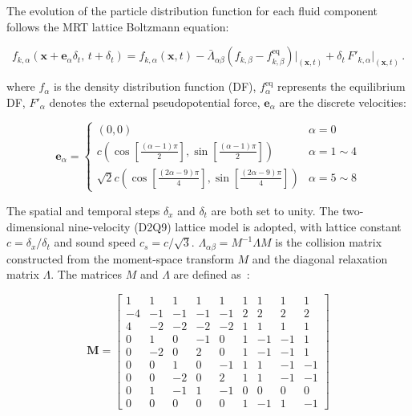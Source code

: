 \documentclass[draft,wrr]{agutexSI2019}
\begin{document}
\begin{article}
The evolution of the particle distribution function for each fluid component
follows the MRT lattice Boltzmann equation:
\begin{linenomath*}
\begin{equation}
\label{eq:mrt-evolution}
f_{k,\alpha}(\mathbf{x}+\mathbf{e}_{\alpha}\delta_t,\, t+\delta_t)
=
f_{k,\alpha}(\mathbf{x},t)
-
\bar{\Lambda}_{\alpha\beta}
\left(
f_{k,\beta}-f_{k,\beta}^{\mathrm{eq}}
\right)\big|_{(\mathbf{x},t)}
+
\delta_t\, F'_{k,\alpha}\big|_{(\mathbf{x},t)} \, .
\end{equation}
\end{linenomath*}
where $f_{\alpha}$ is the density distribution function (DF),
$f_{\alpha}^{\mathrm{eq}}$ represents the equilibrium DF,
$F'_{\alpha}$ denotes the external pseudopotential force,
$\mathbf{e}_{\alpha}$ are the discrete velocities:

\begin{linenomath*}
\begin{equation}
\label{eq:discrete-velocities}
\mathbf{e}_{\alpha} = \begin{cases}
(0,0) & \alpha=0 \\[1.5ex] %
c\left(\cos \left[\frac{(\alpha-1) \pi}{2}\right], \sin \left[\frac{(\alpha-1) \pi}{2}\right]\right) & \alpha=1 \sim 4 \\[1.5ex]
\sqrt{2} c\left(\cos \left[\frac{(2 \alpha-9) \pi}{4}\right], \sin \left[\frac{(2 \alpha-9) \pi}{4}\right]\right) & \alpha=5 \sim 8
\end{cases}
\end{equation}
\end{linenomath*}
The spatial and temporal steps $\delta_x$ and $\delta_t$
are both set to unity. The two-dimensional nine-velocity (D2Q9) lattice model
is adopted, with lattice constant $c = \delta_x/\delta_t$ and sound speed
$c_s = c/\sqrt{3}$.
$\Lambda_{\alpha\beta} = {M}^{-1}{\Lambda}{M}$ is the collision matrix
constructed from the moment-space transform $M$ and the diagonal relaxation
matrix $\Lambda$. The matrices $M$ and $\Lambda$ are defined as~\cite{lallemand_theory_2000}:

\begin{linenomath*}
\begin{equation}
\label{eq:transform-matrix}
\mathbf{M} = \begin{bmatrix}
1 & 1 & 1 & 1 & 1 & 1 & 1 & 1 & 1 \\
-4 & -1 & -1 & -1 & -1 & 2 & 2 & 2 & 2 \\
4 & -2 & -2 & -2 & -2 & 1 & 1 & 1 & 1 \\
0 & 1 & 0 & -1 & 0 & 1 & -1 & -1 & 1 \\
0 & -2 & 0 & 2 & 0 & 1 & -1 & -1 & 1 \\
0 & 0 & 1 & 0 & -1 & 1 & 1 & -1 & -1 \\
0 & 0 & -2 & 0 & 2 & 1 & 1 & -1 & -1 \\
0 & 1 & -1 & 1 & -1 & 0 & 0 & 0 & 0 \\
0 & 0 & 0 & 0 & 0 & 1 & -1 & 1 & -1
\end{bmatrix}
\end{equation}
\end{linenomath*}


\end{article}
\end{document}
